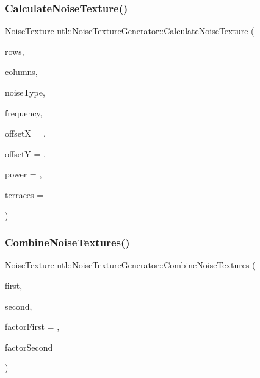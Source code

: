 \subsubsection{\texorpdfstring{Calculate\+Noise\+Texture()}{CalculateNoiseTexture()}}
{\footnotesize\ttfamily \mbox{\hyperlink{classutl_1_1_noise_texture}{Noise\+Texture}} utl\+::\+Noise\+Texture\+Generator\+::\+Calculate\+Noise\+Texture (\begin{DoxyParamCaption}\item[{unsigned int}]{rows,  }\item[{unsigned int}]{columns,  }\item[{\mbox{\hyperlink{namespaceutl_a42b249122648f147a9f518c8661cc8d2}{Noise\+Type}}}]{noise\+Type,  }\item[{float}]{frequency,  }\item[{float}]{offsetX = {},  }\item[{float}]{offsetY = {},  }\item[{float}]{power = {},  }\item[{unsigned int}]{terraces = {} }\end{DoxyParamCaption})}

\mbox{\label{classutl_1_1_noise_texture_generator_a176b962612f04c33976fd08020f81032}} 
\subsubsection{\texorpdfstring{Combine\+Noise\+Textures()}{CombineNoiseTextures()}}
{\footnotesize\ttfamily \mbox{\hyperlink{classutl_1_1_noise_texture}{Noise\+Texture}} utl\+::\+Noise\+Texture\+Generator\+::\+Combine\+Noise\+Textures (\begin{DoxyParamCaption}\item[{const \mbox{\hyperlink{classutl_1_1_noise_texture}{Noise\+Texture}} \&}]{first,  }\item[{const \mbox{\hyperlink{classutl_1_1_noise_texture}{Noise\+Texture}} \&}]{second,  }\item[{const float}]{factor\+First = {},  }\item[{const float}]{factor\+Second = {} }\end{DoxyParamCaption})}



